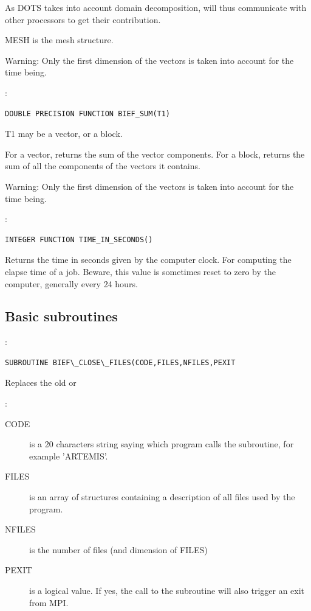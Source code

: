 As DOTS takes into account domain decomposition,  will thus
communicate with other processors to get their contribution.

MESH is the mesh structure.

\begin{WarningBlock}{Warning:}
Only the first dimension of the vectors is taken into account for the time being.
\end{WarningBlock}

:
\begin{lstlisting}[language=TelFortran]
DOUBLE PRECISION FUNCTION BIEF_SUM(T1)
\end{lstlisting}

T1 may be a vector, or a block.

For a vector, returns the sum of the vector components. For a block, returns
the sum of all the components of the vectors it contains.

\begin{WarningBlock}{Warning:}
Only the first dimension of the vectors is taken into account for the time being.
\end{WarningBlock}

:
\begin{lstlisting}[language=TelFortran]
INTEGER FUNCTION TIME_IN_SECONDS()
\end{lstlisting}

Returns the time in seconds given by the computer clock. For computing the
elapse time of a job. Beware, this value is sometimes reset to zero by the
computer, generally every 24 hours.

\subsection{Basic subroutines}

:
\begin{lstlisting}[language=TelFortran]
SUBROUTINE BIEF\_CLOSE\_FILES(CODE,FILES,NFILES,PEXIT
\end{lstlisting}

Replaces the old  or 

:
\begin{description}
  \item [CODE] is a 20 characters string saying which program calls the
    subroutine, for example 'ARTEMIS'.
  \item [FILES] is an array of  structures containing a
    description of all files used by the program.
  \item [NFILES] is the number of files (and dimension of FILES)
  \item [PEXIT] is a logical value. If yes, the call to the subroutine will
    also trigger an exit from MPI.
\end{description}

